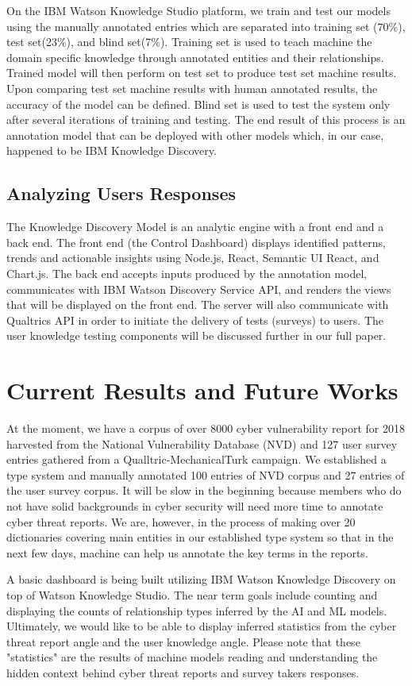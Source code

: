 \documentclass{article} %
\begin{document}
On the IBM Watson Knowledge Studio platform, we train and test our models using the manually annotated entries which are separated into training set (70\%), test set(23\%), and blind set(7\%). Training set is used to teach machine the domain specific knowledge through annotated entities and their relationships. Trained model will then perform on test set to produce test set machine results. Upon comparing test set machine results with human annotated results, the accuracy of the model can be defined. Blind set is used to test the system only after several iterations of training and testing. The end result of this process is an annotation model that can be deployed with other models which, in our case, happened to be IBM Knowledge Discovery.

\subsection{Analyzing Users Responses}
The Knowledge Discovery Model is an analytic engine with a front end and a back end. The front end (the Control Dashboard) displays identified patterns, trends and actionable insights using Node.js, React, Semantic UI React, and Chart.js. The back end accepts inputs produced by the annotation model, communicates with IBM Watson Discovery Service API, and renders the views that will be displayed on the front end. The server will also communicate with Qualtrics API in order to initiate the delivery of tests (surveys) to users. The user knowledge testing components will be discussed further in our full paper.

\section{Current Results and Future Works}
At the moment, we have a corpus of over 8000 cyber vulnerability report for 2018 harvested from the National Vulnerability Database (NVD) and 127 user survey entries gathered from a Qualltric-MechanicalTurk campaign. We established a type system and manually annotated 100 entries of NVD corpus and 27 entries of the user survey corpus. It will be slow in the beginning because members who do not have solid backgrounds in cyber security will need more time to annotate cyber threat reports. We are, however, in the process of making over 20 dictionaries covering main entities in our established type system so that in the next few days, machine can help us annotate the key terms in the reports.

A basic dashboard is being built utilizing IBM Watson Knowledge Discovery on top of Watson Knowledge Studio. The near term goals include counting and displaying the counts of relationship types inferred by the AI and ML models. Ultimately, we would like to be able to display inferred statistics from the cyber threat report angle and the user knowledge angle. Please note that these "statistics" are the results of machine models reading and understanding the hidden context behind cyber threat reports and survey takers responses.
\end{document}

